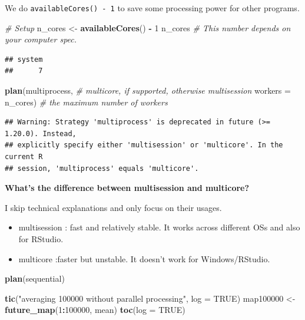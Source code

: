 \documentclass[
]{book}
\newenvironment{Shaded}{\begin{snugshade}}{\end{snugshade}}
\newcommand{\AttributeTok}[1]{\textcolor[rgb]{0.13,0.29,0.53}{#1}}
\newcommand{\CommentTok}[1]{\textcolor[rgb]{0.56,0.35,0.01}{\textit{#1}}}
\newcommand{\ConstantTok}[1]{\textcolor[rgb]{0.56,0.35,0.01}{#1}}
\newcommand{\DecValTok}[1]{\textcolor[rgb]{0.00,0.00,0.81}{#1}}
\newcommand{\FunctionTok}[1]{\textcolor[rgb]{0.13,0.29,0.53}{\textbf{#1}}}
\newcommand{\NormalTok}[1]{#1}
\newcommand{\OtherTok}[1]{\textcolor[rgb]{0.56,0.35,0.01}{#1}}
\newcommand{\SpecialCharTok}[1]{\textcolor[rgb]{0.81,0.36,0.00}{\textbf{#1}}}
\newcommand{\StringTok}[1]{\textcolor[rgb]{0.31,0.60,0.02}{#1}}
\providecommand{\tightlist}{%
  \setlength{\itemsep}{0pt}\setlength{\parskip}{0pt}}
\begin{document}
We do \texttt{availableCores()\ -\ 1} to save some processing power for other programs.

\begin{Shaded}
\begin{Highlighting}[]
\CommentTok{\# Setup }
\NormalTok{n\_cores }\OtherTok{\textless{}{-}} \FunctionTok{availableCores}\NormalTok{() }\SpecialCharTok{{-}} \DecValTok{1}
\NormalTok{n\_cores }\CommentTok{\# This number depends on your computer spec.}
\end{Highlighting}
\end{Shaded}

\begin{verbatim}
## system 
##      7
\end{verbatim}

\begin{Shaded}
\begin{Highlighting}[]
\FunctionTok{plan}\NormalTok{(multiprocess, }\CommentTok{\# multicore, if supported, otherwise multisession}
     \AttributeTok{workers =}\NormalTok{ n\_cores) }\CommentTok{\# the maximum number of workers}
\end{Highlighting}
\end{Shaded}

\begin{verbatim}
## Warning: Strategy 'multiprocess' is deprecated in future (>= 1.20.0). Instead,
## explicitly specify either 'multisession' or 'multicore'. In the current R
## session, 'multiprocess' equals 'multicore'.
\end{verbatim}

\textbf{What's the difference between multisession and multicore?}

I skip technical explanations and only focus on their usages.

\begin{itemize}
\tightlist
\item
  multisession : fast and relatively stable. It works across different OSs and also for RStudio.
\item
  multicore :faster but unstable. It doesn't work for Windows/RStudio.
\end{itemize}

\begin{Shaded}
\begin{Highlighting}[]
\FunctionTok{plan}\NormalTok{(sequential)}

\FunctionTok{tic}\NormalTok{(}\StringTok{"averaging 100000 without parallel processing"}\NormalTok{, }\AttributeTok{log =} \ConstantTok{TRUE}\NormalTok{)}
\NormalTok{map100000 }\OtherTok{\textless{}{-}} \FunctionTok{future\_map}\NormalTok{(}\DecValTok{1}\SpecialCharTok{:}\DecValTok{100000}\NormalTok{, mean)}
\FunctionTok{toc}\NormalTok{(}\AttributeTok{log =} \ConstantTok{TRUE}\NormalTok{)}
\end{Highlighting}
\end{Shaded}
\end{document}
